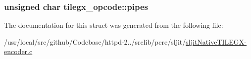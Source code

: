 \subsubsection[{\texorpdfstring{pipes}{pipes}}]{\setlength{\rightskip}{0pt plus 5cm}unsigned char tilegx\+\_\+opcode\+::pipes}\hypertarget{structtilegx__opcode_a80b053aec738c5062d6e7cff90cbaf11}{}\label{structtilegx__opcode_a80b053aec738c5062d6e7cff90cbaf11}


The documentation for this struct was generated from the following file\+:\begin{DoxyCompactItemize}
\item 
/usr/local/src/github/\+Codebase/httpd-\/2../srclib/pcre/sljit/\hyperlink{sljitNativeTILEGX-encoder_8c}{sljit\+Native\+T\+I\+L\+E\+G\+X-\/encoder.\+c}\end{DoxyCompactItemize}

